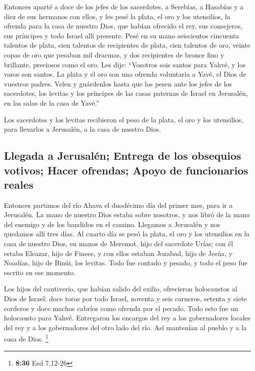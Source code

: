 \begin{paracol}{2}
 Entonces aparté a doce de los jefes de los sacerdotes, a
Serebías, a Hasabías y a diez de sus hermanos con ellos, 
y les pesé la plata, el oro y los utensilios, la ofrenda para la casa de
nuestro Dios, que habían ofrecido el rey, sus consejeros, sus príncipes
y todo Israel allí presente.  Pesé en su mano seiscientos
cincuenta talentos de plata, cien talentos de recipientes de plata, cien
talentos de oro,  veinte copas de oro que pesaban mil
dracmas, y dos recipientes de bronce fino y brillante, preciosos como el
oro.  Les dije: ``Vosotros sois santos para Yahvé, y los
vasos son santos. La plata y el oro son una ofrenda voluntaria a Yavé,
el Dios de vuestros padres.  Velen y guárdenlos hasta que
los pesen ante los jefes de los sacerdotes, los levitas y los príncipes
de las casas paternas de Israel en Jerusalén, en las salas de la casa de
Yavé.''

 Los sacerdotes y los levitas recibieron el peso de la
plata, el oro y los utensilios, para llevarlos a Jerusalén, a la casa de
nuestro Dios.

\hypertarget{llegada-a-jerusaluxe9n-entrega-de-los-obsequios-votivos-hacer-ofrendas-apoyo-de-funcionarios-reales}{%
\subsection{Llegada a Jerusalén; Entrega de los obsequios votivos; Hacer
ofrendas; Apoyo de funcionarios
reales}\label{llegada-a-jerusaluxe9n-entrega-de-los-obsequios-votivos-hacer-ofrendas-apoyo-de-funcionarios-reales}}

 Entonces partimos del río Ahava el duodécimo día del
primer mes, para ir a Jerusalén. La mano de nuestro Dios estaba sobre
nosotros, y nos libró de la mano del enemigo y de los bandidos en el
camino.  Llegamos a Jerusalén y nos quedamos allí tres
días.  Al cuarto día se pesó la plata, el oro y los
utensilios en la casa de nuestro Dios, en manos de Meremot, hijo del
sacerdote Urías; con él estaba Eleazar, hijo de Finees, y con ellos
estaban Jozabad, hijo de Jesúa, y Noadías, hijo de Binúi, los levitas.
 Todo fue contado y pesado, y todo el peso fue escrito en
ese momento.

 Los hijos del cautiverio, que habían salido del exilio,
ofrecieron holocaustos al Dios de Israel: doce toros por todo Israel,
noventa y seis carneros, setenta y siete corderos y doce machos cabríos
como ofrenda por el pecado. Todo esto fue un holocausto para Yahvé.
 Entregaron los encargos del rey a los gobernadores
locales del rey y a los gobernadores del otro lado del río. Así
mantenían al pueblo y a la casa de Dios. \footnote{\textbf{8:36} Esd
  7,12-26}


\end{paracol}
